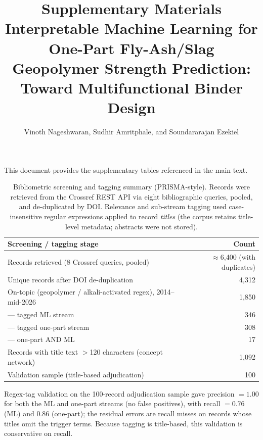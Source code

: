 \documentclass[11pt]{article}
\title{\vspace{-1.5cm}\Large Supplementary Materials\\[4pt]
\large Interpretable Machine Learning for One-Part Fly-Ash/Slag Geopolymer
Strength Prediction: Toward Multifunctional Binder Design}
\author{Vinoth Nageshwaran, Sudhir Amritphale, and Soundararajan Ezekiel}
\date{}
\begin{document}
\maketitle

This document provides the supplementary tables referenced in the main text.

\vspace{0.5cm}

\begin{table}[h]
\centering
\caption{Bibliometric screening and tagging summary (PRISMA-style). Records were
retrieved from the Crossref REST API via eight bibliographic queries, pooled, and
de-duplicated by DOI. Relevance and sub-stream tagging used case-insensitive
regular expressions applied to record \emph{titles} (the corpus retains
title-level metadata; abstracts were not stored).}
\label{tab:s1}
\begin{tabular}{lr}
\toprule
\textbf{Screening / tagging stage} & \textbf{Count} \\
\midrule
Records retrieved (8 Crossref queries, pooled) & $\approx$6{,}400 (with duplicates) \\
Unique records after DOI de-duplication & 4{,}312 \\
On-topic (geopolymer / alkali-activated regex), 2014--mid-2026 & 1{,}850 \\
\quad--- tagged ML stream & 346 \\
\quad--- tagged one-part stream & 308 \\
\quad--- one-part AND ML & 17 \\
Records with title text $>$120 characters (concept network) & 1{,}092 \\
Validation sample (title-based adjudication) & 100 \\
\bottomrule
\end{tabular}
\end{table}

Regex-tag validation on the 100-record adjudication sample gave precision $=1.00$
for both the ML and one-part streams (no false positives), with recall $=0.76$
(ML) and $0.86$ (one-part); the residual errors are recall misses on records whose
titles omit the trigger terms. Because tagging is title-based, this validation is
conservative on recall.

\vspace{0.5cm}
\end{document}
